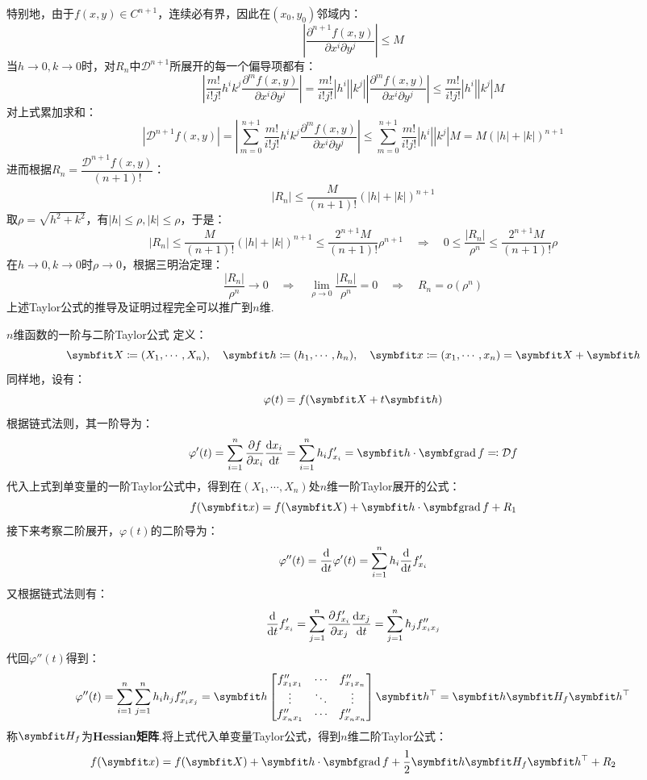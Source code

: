 特别地，由于$f(x,y) \in C^{n+1}$，连续必有界，因此在$(x_0,y_0)$邻域内：
\[\left|\frac{\partial^{n+1}f(x,y)}{\partial x^i \partial y^j}\right| \leqslant M\]
当$h \to 0,k \to 0$时，对$R_n$中$\mathcal{D}^{n+1}$所展开的每一个偏导项都有：
\[\left|\frac{m!}{i!j!}h^i k^j \frac{\partial^m f(x,y)}{\partial x^i \partial y^j}\right| = \frac{m!}{i!j!}|h^i||k^j|\left|\frac{\partial^mf(x,y)}{\partial x^i \partial y^j}\right| \leqslant \frac{m!}{i!j!}|h^i||k^j|M\]
对上式累加求和：
\[|\mathcal{D}^{n+1}f(x,y)| = \left|\sum_{m=0}^{n+1}\frac{m!}{i!j!}h^i k^j \frac{\partial^m f(x,y)}{\partial x^i \partial y^j}\right| \leqslant \sum_{m=0}^{n+1}\frac{m!}{i!j!}|h^i||k^j|M = M(|h|+|k|)^{n+1}\]
进而根据$R_n = \dfrac{\mathcal{D}^{n+1}f(x,y)}{(n+1)!}$：
\[|R_n| \leqslant \frac{M}{(n+1)!}(|h|+|k|)^{n+1}\]
取$\rho = \sqrt{h^2 + k^2}$，有$|h|\leqslant\rho,|k|\leqslant\rho$，于是：
\[|R_n| \leqslant \frac{M}{(n+1)!}(|h|+|k|)^{n+1} \leqslant \frac{2^{n+1}M}{(n+1)!}\rho^{n+1} \quad\Rightarrow\quad 0 \leqslant \frac{|R_n|}{\rho^n} \leqslant \frac{2^{n+1}M}{(n+1)!}\rho\]
在$h\to0,k\to0$时$\rho \to 0$，根据三明治定理：
\[\frac{|R_n|}{\rho^n} \to 0 \quad\Rightarrow\quad \lim_{\rho\to0}\frac{|R_n|}{\rho^n} = 0 \quad\Rightarrow\quad R_n = o(\rho^n)\]
上述Taylor公式的推导及证明过程完全可以推广到$n$维.

\begin{extension}{$n$维函数的一阶与二阶Taylor公式}
    定义：
    \[\vb{X} \coloneq (X_1,\cdots,X_n),\quad \vb{h} \coloneq (h_1,\cdots,h_n),\quad \vb{x} \coloneq (x_1,\cdots,x_n) = \vb{X} + \vb{h}\]
    同样地，设有：
    \[\varphi(t) = f(\vb{X} + t\vb{h})\]
    根据链式法则，其一阶导为：
    \[\varphi'(t) = \sum_{i=1}^{n}\pdv{f}{x_i}\dv{x_i}{t} = \sum_{i=1}^{n}h_i f'_{x_i} = \vb{h}\cdot\grad f \eqcolon \mathcal{D}f\]
    代入上式到单变量的一阶Taylor公式中，得到在$(X_1,\cdots,X_n)$处$n$维一阶Taylor展开的公式：
    \[f(\vb{x}) = f(\vb{X}) + \vb{h}\cdot\grad{f} + R_1\]
    接下来考察二阶展开，$\varphi(t)$的二阶导为：
    \[\varphi''(t) = \dv{t}\varphi'(t) = \sum_{i=1}^{n}h_i\dv{t}f'_{x_i}\]
    又根据链式法则有：
    \[\dv{t}f'_{x_i} = \sum_{j=1}^{n}\pdv{f'_{x_i}}{x_j}\dv{x_j}{t} = \sum_{j=1}^{n}h_j f''_{x_i x_j}\]
    代回$\varphi''(t)$得到：
    \[\varphi''(t) = \sum_{i=1}^{n}\sum_{j=1}^{n}h_i h_j f''_{x_i x_j} = \vb{h} \begin{bmatrix}
        f''_{x_1 x_1} & \cdots & f''_{x_1 x_n} \\
        \vdots & \ddots & \vdots \\
        f''_{x_n x_1} & \cdots & f''_{x_n x_n}
    \end{bmatrix} \vb{h}^\top = \vb{h}\vb{H}_f\vb{h}^\top\]
    称$\vb{H}_f$为\textbf{Hessian矩阵}.将上式代入单变量Taylor公式，得到$n$维二阶Taylor公式：
    \[f(\vb{x}) = f(\vb{X}) + \vb{h}\cdot\grad{f} + \frac{1}{2}\vb{h}\vb{H}_f\vb{h}^{\top} + R_2\]
\end{extension}



